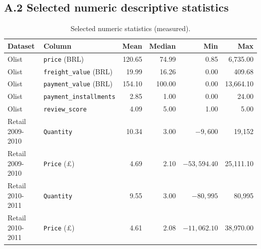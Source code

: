 \documentclass[11pt,a4paper]{article}
\newcommand{\code}[1]{\texttt{#1}}
\begin{document}
\subsection*{A.2 Selected numeric descriptive statistics}
\begin{table}[H]
\centering
\small
\caption{Selected numeric statistics (measured).\label{tab:appendix-num}}
\begin{tabular}{llrrrr}
\toprule
\textbf{Dataset} & \textbf{Column} & \textbf{Mean} & \textbf{Median} & \textbf{Min} & \textbf{Max} \\
\midrule
Olist & \code{price} (BRL) & 120.65 & 74.99 & 0.85 & 6{,}735.00 \\
Olist & \code{freight\_value} (BRL) & 19.99 & 16.26 & 0.00 & 409.68 \\
Olist & \code{payment\_value} (BRL) & 154.10 & 100.00 & 0.00 & 13{,}664.10 \\
Olist & \code{payment\_installments} & 2.85 & 1.00 & 0.00 & 24.00 \\
Olist & \code{review\_score} & 4.09 & 5.00 & 1.00 & 5.00 \\
Retail 2009-2010 & \code{Quantity} & 10.34 & 3.00 & $-9{,}600$ & 19{,}152 \\
Retail 2009-2010 & \code{Price} (\pounds) & 4.69 & 2.10 & $-53{,}594.40$ & 25{,}111.10 \\
Retail 2010-2011 & \code{Quantity} & 9.55 & 3.00 & $-80{,}995$ & 80{,}995 \\
Retail 2010-2011 & \code{Price} (\pounds) & 4.61 & 2.08 & $-11{,}062.10$ & 38{,}970.00 \\
\bottomrule
\end{tabular}
\end{table}
\end{document}
